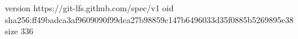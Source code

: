 version https://git-lfs.github.com/spec/v1
oid sha256:ff49badca3af9609090f99dca27b98859c147b6496033d35f0885b5269895e38
size 336
